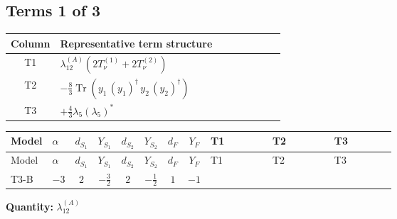 \documentclass[8pt]{article}
\begin{document}
\begin{landscape}
\subsection*{Terms 1 of 3}
\begin{center}
\begin{tabular}{@{}c >{\raggedright\arraybackslash}p{0.82\linewidth}@{}}
\toprule
Column & Representative term structure \\
\midrule
T1 & \(\displaystyle {\lambda_{12}^{(A)}} (2 T_{\nu}^{(1)}+2 T_{\nu}^{(2)})\) \\
\midrule
T2 & \(\displaystyle -\frac{8}{3} \operatorname{Tr}\!\left({y_1}\,\left({y_1}\right)^{\dagger}\,{y_2}\,\left({y_2}\right)^{\dagger}\right)\) \\
\midrule
T3 & \(\displaystyle +\frac{4}{3} {\lambda_5} \left({\lambda_5}\right)^{*}\) \\
\midrule
\bottomrule
\end{tabular}
\end{center}
\smallskip
\tiny
\begin{longtable}{@{}llcccccc >{\raggedright\arraybackslash}p{0.21\linewidth} >{\raggedright\arraybackslash}p{0.21\linewidth} >{\raggedright\arraybackslash}p{0.21\linewidth}@{}}
\toprule
Model & $\alpha$ & $d_{S_1}$ & $Y_{S_1}$ & $d_{S_2}$ & $Y_{S_2}$ & $d_F$ & $Y_F$ & T1 & T2 & T3 \\
\midrule
\endfirsthead
\toprule
Model & $\alpha$ & $d_{S_1}$ & $Y_{S_1}$ & $d_{S_2}$ & $Y_{S_2}$ & $d_F$ & $Y_F$ & T1 & T2 & T3 \\
\midrule
\endhead
T3-B & $-3$ & $2$ & $-\frac{3}{2}$ & $2$ & $-\frac{1}{2}$ & $1$ & $-1$ & \scriptsize\adjustbox{max width=\linewidth}{$\begin{gathered} {\lambda_{12}^{(A)}} (2 T_{\nu}^{(1)}+2 T_{\nu}^{(2)})\end{gathered}$} & \scriptsize\adjustbox{max width=\linewidth}{$\begin{gathered} -\frac{8}{3} \operatorname{Tr}\!\left({y_1}\,\left({y_1}\right)^{\dagger}\,{y_2}\,\left({y_2}\right)^{\dagger}\right)\end{gathered}$} & \scriptsize\adjustbox{max width=\linewidth}{$\begin{gathered} +\frac{4}{3} {\lambda_5} \left({\lambda_5}\right)^{*}\end{gathered}$} \\
\midrule
\bottomrule
\end{longtable}
\clearpage
\noindent\textbf{Quantity: }$\lambda_{12}^{(A)}$\par\smallskip

\end{landscape}
\end{document}
